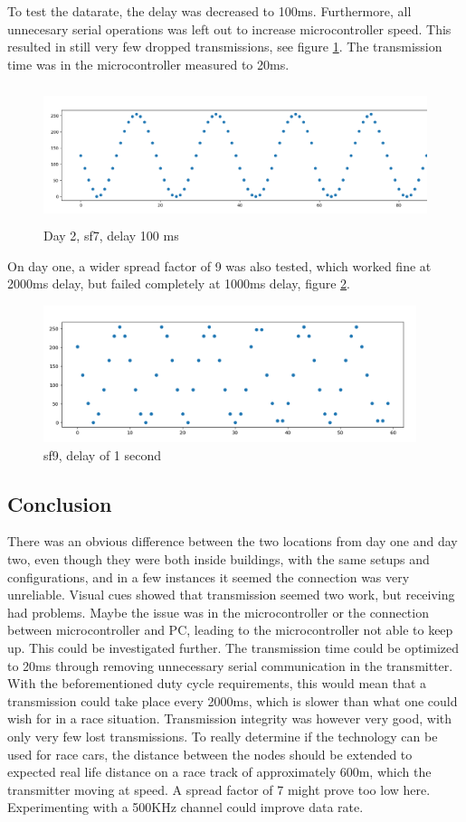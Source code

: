 To test the datarate, the delay was decreased to 100ms. Furthermore, all unnecesary serial operations was left out to increase microcontroller speed. This resulted in still very few dropped transmissions, see figure \ref{fig:sf7-100ms}. The transmission time was in the microcontroller measured to 20ms.
\begin{figure}[h!]
  \centering
  \includegraphics[height = 4cm]{sf7-100ms.png}
  \caption{Day 2, sf7, delay 100 ms}
  \label{fig:sf7-100ms}
\end{figure}
\newpage
On day one, a wider spread factor of 9 was also tested, which worked fine at 2000ms delay, but failed completely at 1000ms delay, figure \ref{fig:sf9}.

\begin{figure}[h!]
  \centering
  \includegraphics[height = 4cm]{sf91000ms.png}
  \caption{sf9, delay of 1 second}
  \label{fig:sf9}
\end{figure}
\newpage
\subsection*{Conclusion}
There was an obvious difference between the two locations from day one and day two, even though they were both inside buildings, with the same setups and configurations, and in a few instances it seemed the connection was very unreliable. Visual cues showed that transmission seemed two work, but receiving had problems. Maybe the issue was in the microcontroller or the connection between microcontroller and PC, leading to the microcontroller not able to keep up. This could be investigated further. The transmission time could be optimized to 20ms through removing unnecessary serial communication in the transmitter. With the beforementioned duty cycle requirements, this would mean that a transmission could take place every 2000ms, which is slower than what one could wish for in a race situation. Transmission integrity was however very good, with only very few lost transmissions. To really determine if the technology can be used for race cars, the distance between the nodes should be extended to expected real life distance on a race track of approximately 600m, which the transmitter moving at speed. A spread factor of 7 might prove too low here. Experimenting with a 500KHz channel could improve data rate.
